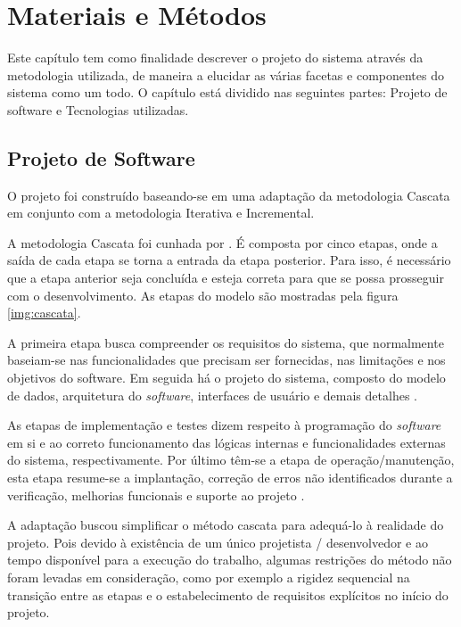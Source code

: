 \chapter{Materiais e Métodos} \label{ch:MM}

Este capítulo tem como finalidade descrever o projeto do sistema através da metodologia utilizada, de maneira a elucidar as várias facetas e componentes do sistema como um todo. O capítulo está dividido nas seguintes partes: Projeto de software e Tecnologias utilizadas.

\section{Projeto de Software} 

O projeto foi construído baseando-se em uma adaptação da metodologia Cascata em conjunto com a metodologia Iterativa e Incremental.

A metodologia Cascata foi cunhada por . É composta por cinco etapas, onde a saída de cada etapa se torna a entrada da etapa posterior. Para isso, é necessário que a etapa anterior seja concluída e esteja correta para que se possa prosseguir com o desenvolvimento. As etapas do modelo são mostradas pela figura \ref{img:cascata}.


A primeira etapa busca compreender os requisitos do sistema, que normalmente baseiam-se nas funcionalidades que precisam ser fornecidas, nas limitações e nos objetivos do software. Em seguida há o projeto do sistema, composto do modelo de dados, arquitetura do \textit{software}, interfaces de usuário e demais detalhes \cite{SITECASCATA1, SITECASCATA2}.

As etapas de implementação e testes dizem respeito à programação do \textit{software} em si e ao correto funcionamento das lógicas internas e funcionalidades externas do sistema, respectivamente. Por último têm-se a etapa de operação/manutenção, esta etapa resume-se a implantação, correção de erros não identificados durante a verificação, melhorias funcionais e suporte ao projeto \cite{SITECASCATA1, SITECASCATA2}.

A adaptação buscou simplificar o método cascata para adequá-lo à realidade do projeto. Pois devido à existência de um único projetista / desenvolvedor e ao tempo disponível para a execução do trabalho, algumas restrições do método não foram levadas em consideração, como por exemplo a rigidez sequencial na transição entre as etapas e o estabelecimento de requisitos explícitos no início do projeto.


